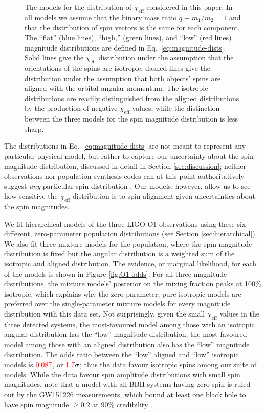 \documentclass[modern,linenumbers]{aastex61}
\newcommand{\chieff}{\chi_\mathrm{eff}}
\newcommand{\checkme}[1]{\textcolor{red}{#1}}
\newcommand{\OOneSigmaIsoAligned}{\checkme{1.7}}
\newcommand{\OOneOddsIsoAligned}{\checkme{0.087}}
\begin{document}
\begin{figure}
  \caption{\label{fig:chieff-distribution-models} The models for the
    distribution of $\chieff$ considered in this paper.  In all models
    we assume that the binary mass ratio $q \equiv m_1/m_2 = 1$ and
    that the distribution of spin vectors is the same for each
    component.  The ``flat'' (blue lines), ``high,'' (green lines),
    and ``low'' (red lines) magnitude distributions are defined in
    Eq.\ \eqref{eq:magnitude-dists}.  Solid lines give the $\chieff$
    distribution under the assumption that the orientations of the
    spins are isotropic; dashed lines give the distribution under the
    assumption that both objects' spins are aligned with the orbital
    angular momentum.  The isotropic distributions are readily
    distinguished from the aligned distributions by the production of negative
    $\chieff$ values, while the distinction between the three models
    for the spin magnitude distribution is less sharp.}
\end{figure}

The distributions in Eq.\ \eqref{eq:magnitude-dists} are not meant to
represent any particular physical model, but rather to capture our
uncertainty about the spin magnitude distribution, discussed in detail
in Section \ref{sec:discussion}; neither observations nor population
synthesis codes can at this point authoritatively suggest {\it any}
particular spin distribution \citep{2015PhR...548....1M}.  Our models,
however, allow us to see how sensitive the $\chieff$ distribution is
to spin alignment given uncertainties about the spin magnitudes.

We fit hierarchical models of the three LIGO O1 observations using
these six different, zero-parameter population distributions (see
Section \ref{sec:hierarchical}).  We also fit three mixture models for
the population, where the spin magnitude distribution is fixed but the
angular distribution is a weighted sum of the isotropic and aligned
distribution.  The evidence, or marginal likelihood, for each of the
models is shown in Figure \ref{fig:O1-odds}.  For all three magnitude
distributions, the mixture models' posterior on the mixing fraction
peaks at 100\% isotropic, which explains why the zero-parameter,
pure-isotropic models are preferred over the single-parameter mixture
models for every magnitude distribution with this data set.  Not
surprisingly, given the small $\chieff$ values in the three detected
systems, the most-favoured model among those with an isotropic angular
distribution has the ``low'' magnitude distribution; the most favoured
model among those with an aligned distribution also has the ``low''
magnitude distribution.  The odds ratio between the ``low'' aligned
and ``low'' isotropic models is $\OOneOddsIsoAligned$, or
$\OOneSigmaIsoAligned\sigma$; thus the data favour isotropic spins
among our suite of models.  While the data favour spin amplitude
distributions with small spin magnitudes, note that a model with all
\ac{BBH} systems having zero spin is ruled out by the GW151226
measurements, which bound at least one black hole to have spin
magnitude $\geq 0.2$ at 90\% credibility \citep{2016PhRvL.116x1103A}.
\end{document}
